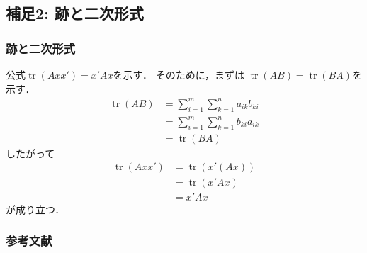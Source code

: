 \documentclass[10pt,usepdftitle=false,hyperref={unicode}]{beamer}
\DeclareMathOperator*{\tr}{tr}
\newcommand{\parentheses}[1]{\left(#1\right)}
\begin{document}
\subsection{補足2: 跡と二次形式}
\label{sec:trace}
\begin{frame}
\frametitle{跡と二次形式}
公式$\tr \parentheses{Axx'} = x'Ax$を示す．
そのために，まずは
$\tr \parentheses{AB} = \tr\parentheses{BA}$を示す．
\begin{align*}
    \tr \parentheses{AB}
    &= \sum_{i = 1}^m \sum_{k = 1}^n a_{ik}b_{ki} \\
    &= \sum_{i = 1}^m \sum_{k = 1}^n b_{ki}a_{ik} \\
    &= \tr \parentheses{BA}
\end{align*}
したがって
\begin{align*}
    \tr \parentheses{Axx'}
    &= \tr \parentheses{x'\parentheses{Ax}} \\
    &= \tr \parentheses{x'Ax} \\
    &= x'Ax
\end{align*}
が成り立つ．
\end{frame}

\begin{frame}
\frametitle{参考文献}


\end{frame}
\end{document}
